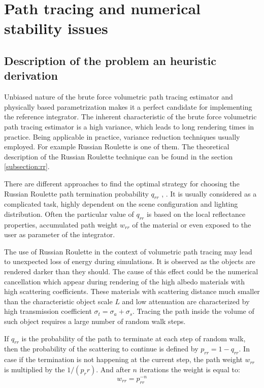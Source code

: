 \section{Path tracing and numerical stability issues}
\label{section:numerical}

\subsection{Description of the problem an heuristic derivation}
Unbiased nature of the brute force volumetric path tracing estimator and physically based
parametrization makes it a perfect candidate for implementing the reference integrator.
The inherent characteristic of the brute force volumetric path tracing estimator is a high variance,
which leads to long rendering times in practice. Being applicable in practice, variance reduction
techniques usually employed. For example Russian Roulette is one of them. The theoretical
description of the Russian Roulette technique can be found in the section \ref{subsection:rr}.

There are different approaches to find the optimal strategy for choosing the Russian Roulette path
termination probability $q_{rr}$ \cite{Veach:1998:RMC:927297}, \cite{And_findinggood}. It is usually
considered as a complicated task, highly dependent on the scene configuration and lighting
distribution. Often the particular value of $q_{rr}$ is based on the local reflectance properties,
accumulated path weight $w_{rr}$ of the material or even exposed to the user as parameter of the
integrator.

The use of Russian Roulette in the context of volumetric path tracing may lead to unexpected loss of
energy during simulations. It is observed as the objects are rendered darker than they should. The
cause of this effect could be the numerical cancellation which appear during rendering of the high
albedo materials with high scattering coefficients. These materials with scattering distance much
smaller than the characteristic object scale $L$ and low attenuation are characterized by high
transmission coefficient $\sigma_t = \sigma_a + \sigma_s$. Tracing the path inside the volume of
such object requires a large number of random walk steps. 

If $q_{rr}$ is the probability of the path to terminate at each step of random walk, then the
probability of the scattering to continue is defined by $p_{rr} = 1 - q_{rr}$. In case if the
termination is not happening at the current step, the path weight $w_{rr}$ is multiplied by the
$1/(p_rr)$. And after $n$ iterations the weight is equal to:
\begin{equation}
w_{rr} = p_{rr}^{-n}
\end{equation}

